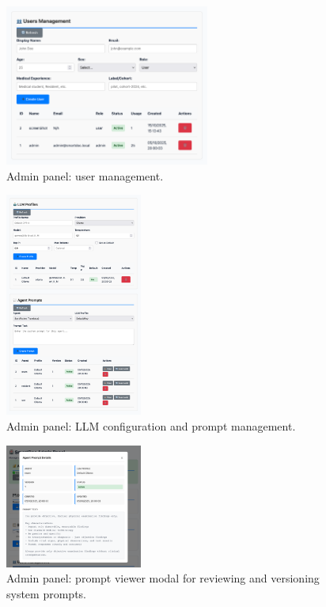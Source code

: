 \begin{figure}[h]
  \centering
  \includegraphics[width=0.6\textwidth]{figures/ui/ui_set2.png}
  \caption{Admin panel: user management.}
  \label{fig:ui-set2}
\end{figure}

\newpage

\begin{figure}[h]
  \centering
  \includegraphics[width=0.4\textwidth]{figures/ui/ui_set3.png}
  \caption{Admin panel: LLM configuration and prompt management.}
  \label{fig:ui-set3}
\end{figure}

\begin{figure}[h]
  \centering
  \includegraphics[width=0.4\textwidth]{figures/ui/ui_set4.png}
  \caption{Admin panel: prompt viewer modal for reviewing and versioning system prompts.}
  \label{fig:ui-set4}
\end{figure}

